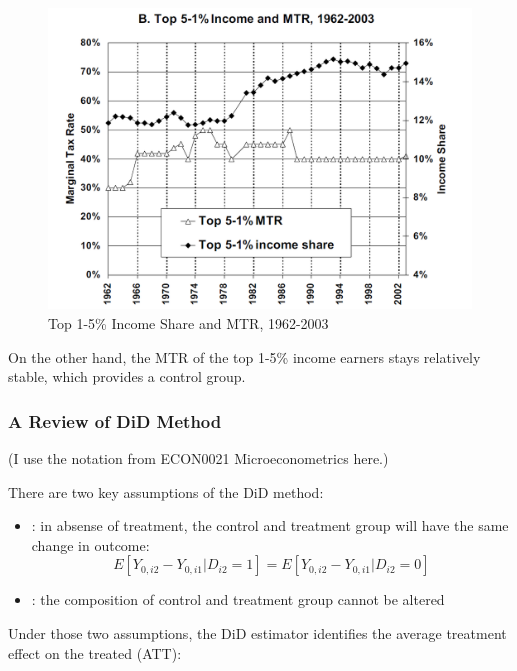                 \begin{figure}[H]
                    \centering
                    \includegraphics[width=4.5in]{images/ch13/13_DID_2.png}
                    \caption{Top 1-5\% Income Share and MTR, 1962-2003}
                \end{figure}

                On the other hand, the MTR of the top 1-5\% income earners stays relatively stable, which provides a control group.

            \subsubsection{A Review of DiD Method}

                (I use the notation from ECON0021 Microeconometrics here.)
                
                There are two key assumptions of the DiD method:
                \begin{itemize}
                    \item {}: in absense of treatment, the control and treatment group will have the same change in outcome:
                    \begin{equation*}
                        E[Y_{0,i2}-Y_{0,i1}|D_{i2}=1]=E[Y_{0,i2}-Y_{0,i1}|D_{i2}=0]
                    \end{equation*}
                    \item {}: the composition of control and treatment group cannot be altered
                \end{itemize}

                Under those two assumptions, the DiD estimator identifies the average treatment effect on the treated (ATT):

